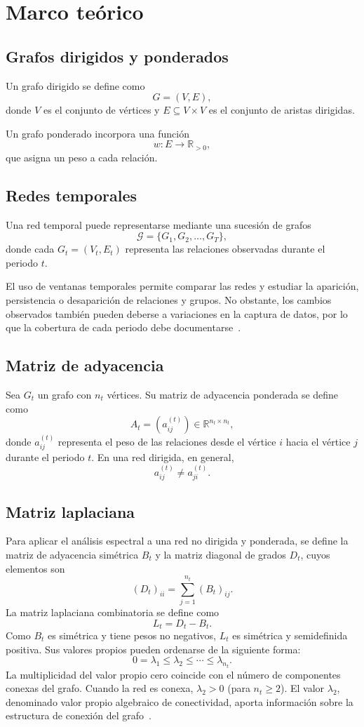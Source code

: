 \documentclass[journal]{IEEEtran}
\begin{document}
\section{Marco teórico}
\subsection{Grafos dirigidos y ponderados}
Un grafo dirigido se define como
\[
G=(V,E),
\]
donde $V$ es el conjunto de vértices y $E\subseteq V\times V$ es el conjunto de aristas dirigidas.

Un grafo ponderado incorpora una función
\[
w:E\longrightarrow\mathbb R_{>0},
\]
que asigna un peso a cada relación.

\subsection{Redes temporales}
Una red temporal puede representarse mediante una sucesión de grafos
\[
\mathcal G=\{G_1,G_2,\ldots,G_T\},
\]
donde cada $G_t=(V_t,E_t)$ representa las relaciones observadas durante el periodo $t$.

El uso de ventanas temporales permite comparar las redes y estudiar la aparición, persistencia o desaparición de relaciones y grupos. No obstante, los cambios observados también pueden deberse a variaciones en la captura de datos, por lo que la cobertura de cada periodo debe documentarse~\cite{holme}.

\subsection{Matriz de adyacencia}
Sea $G_t$ un grafo con $n_t$ vértices. Su matriz de adyacencia ponderada se define como
\[
A_t=(a^{(t)}_{ij})\in\mathbb R^{n_t\times n_t},
\]
donde $a^{(t)}_{ij}$ representa el peso de las relaciones desde el vértice $i$ hacia el vértice $j$ durante el periodo $t$. En una red dirigida, en general,
\[
a^{(t)}_{ij}\ne a^{(t)}_{ji}.
\]

\subsection{Matriz laplaciana}
Para aplicar el análisis espectral a una red no dirigida y ponderada, se define la matriz de adyacencia simétrica $B_t$ y la matriz diagonal de grados $D_t$, cuyos elementos son
\[
(D_t)_{ii}=\sum_{j=1}^{n_t}(B_t)_{ij}.
\]
La matriz laplaciana combinatoria se define como
\[
L_t=D_t-B_t.
\]
Como $B_t$ es simétrica y tiene pesos no negativos, $L_t$ es simétrica y semidefinida positiva. Sus valores propios pueden ordenarse de la siguiente forma:
\[
0=\lambda_1\le\lambda_2\le\cdots\le\lambda_{n_t}.
\]
La multiplicidad del valor propio cero coincide con el número de componentes conexas del grafo. Cuando la red es conexa, $\lambda_2>0$ (para $n_t\ge 2$). El valor $\lambda_2$, denominado valor propio algebraico de conectividad, aporta información sobre la estructura de conexión del grafo~\cite{chung}.
\end{document}
